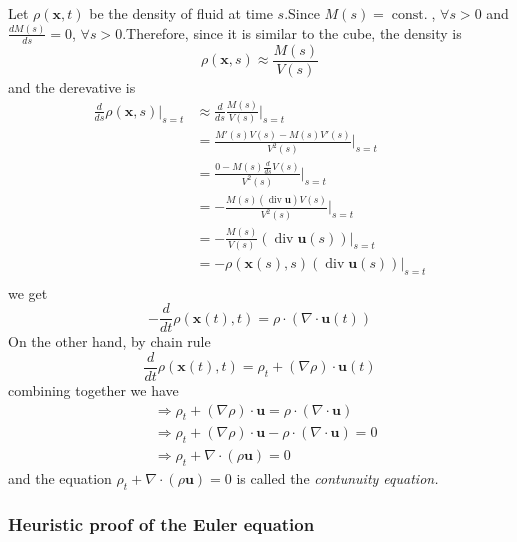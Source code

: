 Let $\rho(\textbf{x},t)$ be the density of fluid at time $s$.Since $M(s)=\operatorname{const.}$, $\forall s>0$ and $\displaystyle \frac{dM(s)}{ds} = 0$, $\forall s>0$.Therefore, since it is similar to the cube, the density is
\begin{equation}
\rho(\textbf{x},s) \approx \frac{M(s)}{V(s)}
\end{equation}
and the derevative is 
\begin{equation}
\begin{aligned}
\frac{d}{ds}\rho(\textbf{x},s) \Bigg|_{s=t}
&\approx \frac{d}{ds}\frac{M(s)}{V(s)} \Bigg|_{s=t}\\
&= \frac{M'(s)V(s) - M(s)V'(s)}{V^2(s)} \Bigg|_{s=t}\\
&= \frac{0 - M(s)\frac{d}{ds}V(s)}{V^2(s)} \Bigg|_{s=t}\\
&=  -\frac{M(s)(\operatorname{div}\textbf{u})V(s)}{V^2(s)} \Bigg|_{s=t}\\
&=  -\frac{M(s)}{V(s)}(\operatorname{div}\textbf{u}(s)) \Bigg|_{s=t}\\
&=  -\rho(\textbf{x}(s),s)(\operatorname{div}\textbf{u}(s)) \Bigg|_{s=t}\\
\end{aligned}
\end{equation}
we get 
\begin{equation}
- \frac{d}{dt}\rho(\textbf{x}(t),t) = \rho \cdot (\nabla\cdot \textbf{u}(t))
\end{equation}
On the other hand, by chain rule
\begin{equation}
\frac{d}{dt}\rho(\textbf{x}(t),t) = \rho_t + (\nabla\rho)\cdot \textbf{u}(t)
\end{equation}
combining together we have
\begin{equation}
\begin{aligned}
&\Rightarrow \rho_t + (\nabla\rho)\cdot \textbf{u} = \rho \cdot (\nabla\cdot \textbf{u})\\
&\Rightarrow \rho_t + (\nabla\rho)\cdot \textbf{u} - \rho \cdot (\nabla\cdot \textbf{u}) = 0\\
&\Rightarrow \rho_t + \nabla\cdot (\rho\textbf{u} ) = 0
\end{aligned}
\end{equation}
and the equation $\rho_t + \nabla\cdot (\rho\textbf{u} ) = 0$ is called the \textit{contunuity equation.}

\subsubsection{Heuristic proof of the Euler equation} %

